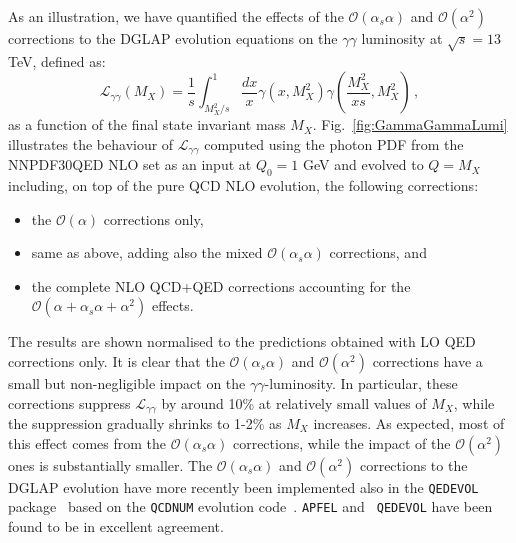 As an illustration, we have quantified the effects of the
$\mathcal{O}(\alpha_s\alpha)$ and $\mathcal{O}(\alpha^2)$ corrections
to the DGLAP evolution equations on the $\gamma\gamma$ luminosity at
$\sqrt{s} = 13$ TeV, defined as:
\begin{equation}\label{eq:GammaGammaLumi}
  \mathcal{L}_{\gamma\gamma}(M_X) = \frac1{s}\int_{M_X^2/s}^1
  \frac{dx}{x} \gamma(x,M_X^2) \gamma\left(\frac{M_X^2}{xs},M_X^2\right)\,,
\end{equation}
as a function of the final state invariant mass $M_X$.
%
Fig.~\ref{fig:GammaGammaLumi} illustrates the behaviour of
$\mathcal{L}_{\gamma\gamma}$ computed using the photon PDF from the
NNPDF30QED NLO set as an input at $Q_0 = 1$ GeV and evolved to $Q=M_X$
including, on top of the pure QCD NLO evolution, the following
corrections:
\begin{itemize}
\item the $\mathcal{O}(\alpha)$ corrections only,
\item same as above, adding also the mixed
  $\mathcal{O}(\alpha_s\alpha)$ corrections, and
\item the complete NLO QCD+QED corrections accounting for the
  $\mathcal{O}(\alpha+\alpha_s\alpha+\alpha^2)$ effects.
\end{itemize}
The results are shown normalised to the predictions obtained with LO
QED corrections only.
%
It is clear that the $\mathcal{O}(\alpha_s\alpha)$ and
$\mathcal{O}(\alpha^2)$ corrections have a small but non-negligible
impact on the $\gamma\gamma$-luminosity. In particular, these
corrections suppress $\mathcal{L}_{\gamma\gamma}$ by around 10\% at
relatively small values of $M_X$, while the suppression gradually
shrinks to 1-2\% as $M_X$ increases. As expected, most of this effect
comes from the $\mathcal{O}(\alpha_s\alpha)$ corrections, while the
impact of the $\mathcal{O}(\alpha^2)$ ones is substantially smaller.
The $\mathcal{O}(\alpha_s\alpha)$ and $\mathcal{O}(\alpha^2)$
corrections to the DGLAP evolution have more recently been implemented
also in the {\tt QEDEVOL} package~\cite{Sadykov:2014aua} based on the
{\tt QCDNUM} evolution code~\cite{Botje:2010ay}. {\tt APFEL} and {\tt
  QEDEVOL} have been found to be in excellent agreement.

